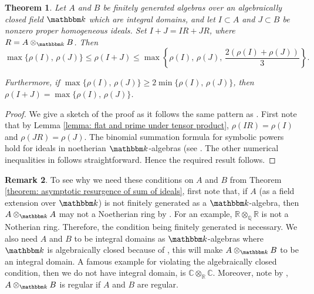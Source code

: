 \documentclass[12pt]{amsart}
\numberwithin{equation}{section}
\newtheorem{theorem}{Theorem}[section]
\theoremstyle{definition}
\newtheorem{remark}[theorem]{Remark}
\newcommand{\kk}{{\mathbbm k}}
\begin{document}
	\begin{theorem} \label{theorem: resurgence bound of sum of ideals} 
Let $A$ and $B$ be finitely generated algebras over an algebraically closed field $\kk$ which are integral domains, and let $I \subset A$ and $J \subset B$ be nonzero proper homogeneous ideals. Set $I+J=IR+JR$, where $R=A\otimes_{\kk} B$. 
Then $$
\max \{ \rho(I), \, \rho(J) \} \leqslant \rho(I + J) \leqslant \max \left\{ \rho(I), \, \rho(J), \, \frac{2 (\rho(I) + \rho(J))}{3} \right\}.
$$

Furthermore, if $\max \{ \rho(I), \, \rho(J) \} \geqslant 2 \min \{ \rho(I), \, \rho(J) \}$, then $\rho(I + J) = \max \{ \rho(I), \, \rho(J) \}$. 
	\end{theorem}
\begin{proof}
We give a sketch of the proof as it follows the same pattern as \cite[Theorem 2.3]{sharpbound}.	
First note that by Lemma \ref{lemma: flat and prime under tensor product}, $\rho(IR)=\rho(I)$ and $\rho(JR)=\rho(J)$. The binomial summation formula for symbolic powers hold for ideals in noetherian $\kk$-algebras (see \cite[Theorem 4.1]{ha2023binomial}. The other numerical inequalities in \cite[Theorem 2.3]{sharpbound} follows straightforward. Hence the required result follows. 
\end{proof}

\begin{remark}	
	To see why we need these conditions on $A$ and $B$ from Theorem \ref{theorem: asymptotic resurgence of sum of ideals}, first note that, if $A$ (as a field extension over $\kk$) is not finitely generated as a $\kk$-algebra, then $A \otimes_\kk A$ may not a Noetherian ring by \cite[Theorem 11]{vmos}. For an example, $\mathbb{R} \otimes_{\mathbb{Q}} \mathbb{R}$ is not a Notherian ring. Therefore, the condition being finitely generated is necessary. We also need $A$ and $B$ to be integral domains as $\kk$-algebras where $\kk$ is algebraically closed because of \cite[Lemma 1.54]{algvar}, this will make $A \otimes_\kk B$ to be an integral domain. A famous example for violating the algebraically closed condition, then we do not have integral domain, is $\mathbb{C} \otimes_{\mathbb{R}} \mathbb{C}$. Moreover, note by \cite[Theorem 6(e)]{Regulartensor}, $A\otimes_{\kk} B$ is regular if $A$ and $B$ are regular. 
\end{remark}

	
		
\end{document}
